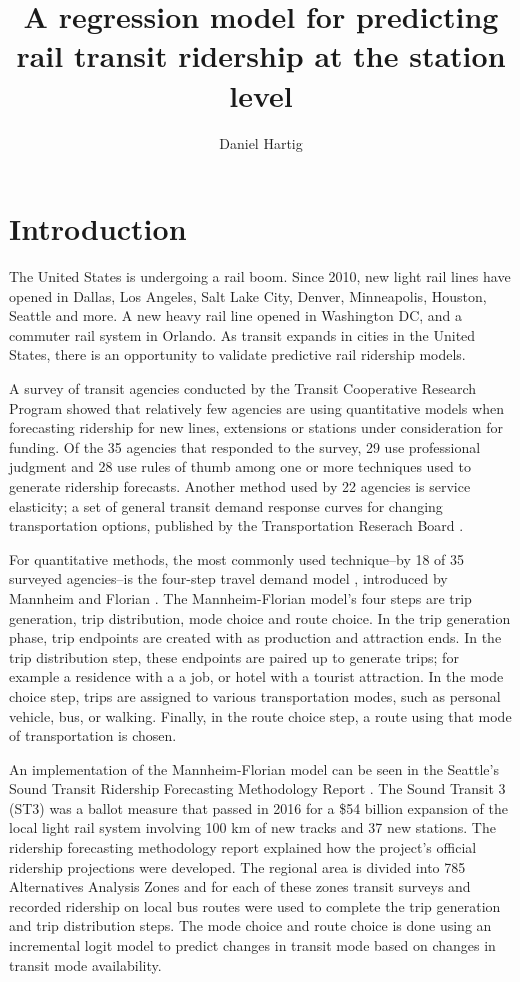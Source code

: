 \documentclass{article}
\title{A regression model for predicting rail transit ridership at the station level}
\author{Daniel Hartig}
\date{\vspace{-5ex}}
\begin{document}
\maketitle

\section{Introduction}

The United States is undergoing a rail boom. Since 2010, new light rail lines have opened in Dallas, Los Angeles, Salt Lake City, Denver, Minneapolis, Houston, Seattle and more.  A new heavy rail line opened in Washington DC, and a commuter rail system in Orlando. As transit expands in cities in the United States, there is an opportunity to validate predictive rail ridership models. 

A survey of transit agencies \cite{Boyle2006} conducted by the Transit Cooperative Research Program showed that relatively few agencies are using quantitative models when forecasting ridership for new lines, extensions or stations under consideration for funding. Of the 35 agencies that responded to the survey, 29 use professional judgment and 28 use rules of thumb among one or more techniques used to generate ridership forecasts. Another method used by 22 agencies is service elasticity; a set of general transit demand response curves for changing transportation options, published by the Transportation Reserach Board \cite{tcrp95}. 

For quantitative methods, the most commonly used technique--by 18 of 35 surveyed agencies--is the four-step travel demand model \cite{McNally2008}, introduced by Mannheim and Florian \cite{Mannheim1979, Florian1988}. The Mannheim-Florian model's four steps are trip generation, trip distribution, mode choice and route choice. In the trip generation phase, trip endpoints are created with as production and attraction ends. In the trip distribution step, these endpoints are paired up to generate trips; for example a residence with a a job, or hotel with a tourist attraction. In the mode choice step, trips are assigned to various transportation modes, such as personal vehicle, bus, or walking. Finally, in the route choice step, a route using that mode of transportation is chosen.

An implementation of the Mannheim-Florian model can be seen in the Seattle's Sound Transit Ridership Forecasting Methodology Report \cite{ST3_2015, ST3_add}. The Sound Transit 3 (ST3) was a ballot measure that passed in 2016 for a \$54 billion expansion of the local light rail system involving 100 km of new tracks and 37 new stations. The ridership forecasting methodology report explained how the project's official ridership projections were developed. The regional area is divided into 785 Alternatives Analysis Zones and for each of these zones transit surveys and recorded ridership on local bus routes were used to complete the trip generation and trip distribution steps. The mode choice and route choice is done using an incremental logit model to predict changes in transit mode based on changes in transit mode availability.
\end{document}
